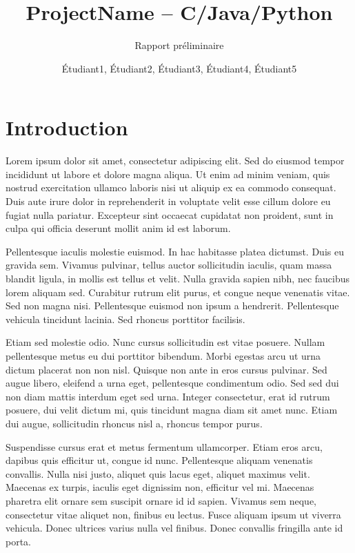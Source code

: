 \documentclass[a4paper]{article}
\title{ProjectName -- C/Java/Python}
\subtitle{Rapport préliminaire}
\author{Étudiant1, Étudiant2, Étudiant3, Étudiant4, Étudiant5}
\begin{document}

\maketitle
\thispagestyle{empty}


\section*{Introduction}

Lorem ipsum dolor sit amet, consectetur adipiscing elit. Sed do eiusmod tempor
incididunt ut labore et dolore magna aliqua. Ut enim ad minim veniam, quis
nostrud exercitation ullamco laboris nisi ut aliquip ex ea commodo consequat.
Duis aute irure dolor in reprehenderit in voluptate velit esse cillum dolore eu
fugiat nulla pariatur. Excepteur sint occaecat cupidatat non proident, sunt in
culpa qui officia deserunt mollit anim id est laborum.

Pellentesque iaculis molestie euismod. In hac habitasse platea dictumst. Duis eu
gravida sem. Vivamus pulvinar, tellus auctor sollicitudin iaculis, quam massa
blandit ligula, in mollis est tellus et velit. Nulla gravida sapien nibh, nec
faucibus lorem aliquam sed. Curabitur rutrum elit purus, et congue neque
venenatis vitae. Sed non magna nisi. Pellentesque euismod non ipsum a hendrerit.
Pellentesque vehicula tincidunt lacinia. Sed rhoncus porttitor facilisis.

Etiam sed molestie odio. Nunc cursus sollicitudin est vitae posuere. Nullam
pellentesque metus eu dui porttitor bibendum. Morbi egestas arcu ut urna dictum
placerat non non nisl. Quisque non ante in eros cursus pulvinar. Sed augue
libero, eleifend a urna eget, pellentesque condimentum odio. Sed sed dui non
diam mattis interdum eget sed urna. Integer consectetur, erat id rutrum posuere,
dui velit dictum mi, quis tincidunt magna diam sit amet nunc. Etiam dui augue,
sollicitudin rhoncus nisl a, rhoncus tempor purus.

Suspendisse cursus erat et metus fermentum ullamcorper. Etiam eros arcu, dapibus
quis efficitur ut, congue id nunc. Pellentesque aliquam venenatis convallis.
Nulla nisi justo, aliquet quis lacus eget, aliquet maximus velit. Maecenas ex
turpis, iaculis eget dignissim non, efficitur vel mi. Maecenas pharetra elit
ornare sem suscipit ornare id id sapien. Vivamus sem neque, consectetur vitae
aliquet non, finibus eu lectus. Fusce aliquam ipsum ut viverra vehicula. Donec
ultrices varius nulla vel finibus. Donec convallis fringilla ante id porta.
\end{document}
